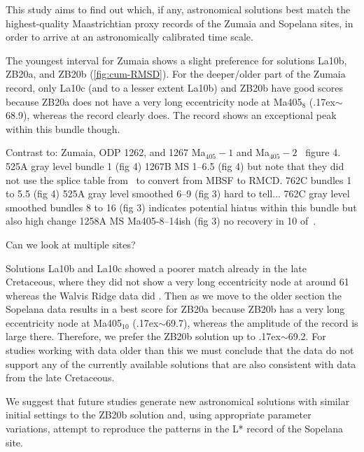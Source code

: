 \documentclass[draft]{agujournal2019}
\newcommand{\appr}{\raise.17ex\hbox{$\scriptstyle\sim$}} %
\begin{document}
This study aims to find out which, if any, astronomical solutions best match the highest-quality Maastrichtian proxy records of the Zumaia and Sopelana sites, in order to arrive at an astronomically calibrated time scale.

The youngest interval for Zumaia shows a slight preference for solutions La10b, ZB20a, and ZB20b (\cref{fig:cum-RMSD}).
For the deeper/older part of the Zumaia record, only La10c (and to a lesser extent La10b) and ZB20b have good scores because ZB20a does not have a very long eccentricity node at Ma405\(_{8}\) (\appr\qty{68.9}{\millionyearago}), whereas the record clearly does.
The record shows an exceptional peak within this bundle though.

Contrast to: Zumaia, ODP 1262, and 1267 Ma\(_{405}-1\) and Ma\(_{405}-2\)~\cite{Westerhold2008} figure 4.
525A gray level bundle 1 (fig 4)
1267B MS 1--6.5 (fig 4) but note that they did not use the splice table from~\cite{Westerhold2008} to convert from MBSF to RMCD.
762C bundles 1 to 5.5 (fig 4)
525A gray level smoothed 6--9 (fig 3) hard to tell...
762C gray level smoothed bundles 8 to 16 (fig 3) indicates potential hiatus within this bundle but also high change
1258A MS Ma405-8--14ish (fig 3) no recovery in 10
of~.

Can we look at multiple sites?


Solutions La10b and La10c showed a poorer match already in the late Cretaceous, where they did not show a very long eccentricity node at around \qty{61}{\millionyearago} whereas the Walvis Ridge data did \cite{ZeebeLourens2022EPSL}.
Then as we move to the older section the Sopelana data results in a best score for ZB20a because ZB20b has a very long eccentricity node at Ma405\(_{10}\) (\appr\qty{69.7}{\millionyearago}), whereas the amplitude of the record is large there.
Therefore, we prefer the ZB20b solution up to \appr\qty{69.2}{\millionyearago}.
For studies working with data older than this we must conclude that the data do not support any of the currently available solutions that are also consistent with data from the late Cretaceous.

We suggest that future studies generate new astronomical solutions with similar initial settings to the ZB20b solution and, using appropriate parameter variations, attempt to reproduce the patterns in the \gls{L*} record of the Sopelana site.
\end{document}
